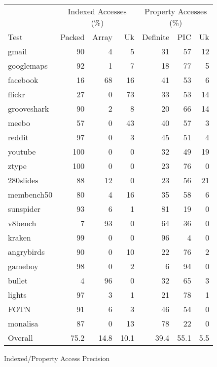 \begin{figure}
\begin{center}
\begin{tabular}{lrrrrrr}
\toprule
     & \multicolumn{3}{c}{Indexed Accesses (\%)}
     & \multicolumn{3}{c}{Property Accesses (\%)} \\
\cmidrule(r){2-4}
\cmidrule{5-7}
Test & Packed & Array & Uk
     & Definite & PIC & Uk \\
\midrule
gmail          & 90 & 4 & 5 & 31 & 57 & 12 \\
googlemaps     & 92 & 1 & 7 & 18 & 77 & 5 \\
facebook       & 16 & 68 & 16 & 41 & 53 & 6 \\
flickr         & 27 & 0 & 73 & 33 & 53 & 14 \\
grooveshark    & 90 & 2 & 8 & 20 & 66 & 14 \\
meebo          & 57 & 0 & 43 & 40 & 57 & 3 \\
reddit         & 97 & 0 & 3 & 45 & 51 & 4 \\
youtube        & 100 & 0 & 0 & 32 & 49 & 19 \\
ztype          & 100 & 0 & 0 & 23 & 76 & 0 \\
280slides      & 88 & 12 & 0 & 23 & 56 & 21 \\
membench50     & 80 & 4 & 16 & 35 & 58 & 6 \\
\midrule
sunspider      & 93 & 6 & 1 & 81 & 19 & 0 \\
v8bench        & 7 & 93 & 0 & 64 & 36 & 0 \\
kraken         & 99 & 0 & 0 & 96 & 4 & 0 \\
\midrule
angrybirds     & 90 & 0 & 10 & 22 & 76 & 2 \\
gameboy        & 98 & 0 & 2 & 6 & 94 & 0 \\
bullet         & 4 & 96 & 0 & 32 & 65 & 3 \\
lights         & 97 & 3 & 1 & 21 & 78 & 1 \\
FOTN           & 91 & 6 & 3 & 46 & 54 & 0 \\
monalisa       & 87 & 0 & 13 & 78 & 22 & 0 \\
\midrule
Overall        & 75.2 & 14.8 & 10.1 & 39.4 & 55.1 & 5.5 \\
\bottomrule
\end{tabular}
\end{center}
\nocaptionrule \caption{Indexed/Property Access Precision}
\label{fig:access_objects}
\end{figure}

